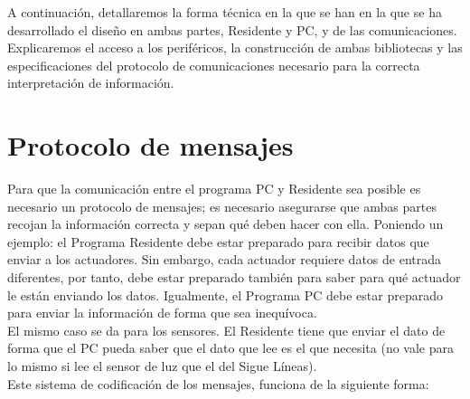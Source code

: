 A continuación, detallaremos la forma técnica en la que se han en la que se ha desarrollado el diseño en ambas partes, Residente y PC, y de las comunicaciones. Explicaremos el acceso a los periféricos, la construcción de ambas bibliotecas y las especificaciones del protocolo de comunicaciones necesario para la correcta interpretación de información. 

\section{Protocolo de mensajes}\label{sec:protocolomensajes}
Para que la comunicación entre el programa PC y Residente sea posible es necesario un protocolo de mensajes; es necesario asegurarse que ambas partes recojan la información correcta y sepan qué deben hacer con ella. Poniendo un ejemplo: el Programa Residente debe estar preparado para recibir datos que enviar a los actuadores. Sin embargo, cada actuador requiere datos de entrada diferentes, por tanto, debe estar preparado también para saber para qué actuador le están enviando los datos. Igualmente, el Programa PC debe estar preparado para enviar la información de forma que sea inequívoca. \\
El mismo caso se da para los sensores. El Residente tiene que enviar el dato de forma que el PC pueda saber que el dato que lee es el que necesita (no vale para lo mismo si lee el sensor de luz que el del Sigue Líneas). \\
Este sistema de codificación de los mensajes, funciona de la siguiente forma:
